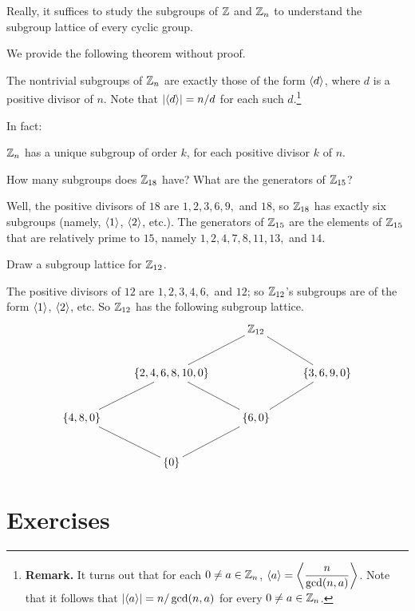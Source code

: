 Really, it suffices to study the subgroups of $\mathbb{Z}$ and $\mathbb{Z}_n$ to understand the subgroup lattice of every cyclic group.

We provide the following theorem without proof.

\begin{thm}\label{znsubgps} The nontrivial subgroups of $\mathbb{Z}_n$ are exactly those of the form $\langle d\rangle$, where $d$ is a positive divisor of $n$. Note that $|\langle d\rangle|=n/d$ for each such $d$.\footnote{
\textbf{Remark.} It turns out that for each $0\neq a\in \mathbb{Z}_n$, $\displaystyle{\langle a\rangle=\left\langle\frac{n}{\gcd(n,a)}\right\rangle}$. Note that it follows that $|\langle a\rangle|=n/\gcd(n,a)$ for every $0\neq a \in \mathbb{Z}_n$.} \end{thm}


In fact:
\begin{thm}\label{} $\mathbb{Z}_n$ has a unique subgroup of order $k$, for each positive divisor $k$ of $n$.\end{thm}

\begin{example}{} How many subgroups does $\mathbb{Z}_{18}$ have?  What are the generators of $\mathbb{Z}_{15}$?

Well, the positive divisors of $18$ are $1,2,3,6,9,$ and $18$, so $\mathbb{Z}_{18}$ has exactly six subgroups (namely, $\langle1\rangle$, $\langle2\rangle$, etc.).
The generators of $\mathbb{Z}_{15}$ are the elements of $\mathbb{Z}_{15}$ that are relatively prime to $15$, namely $1,2,4,7,8,11,13,$ and $14$. \end{example}


\begin{example}{} Draw a subgroup lattice for $\mathbb{Z}_{12}$.

The positive divisors of $12$ are $1,2,3,4,6,$ and $12$; so
$\mathbb{Z}_{12}$'s subgroups are of the form $\langle1\rangle$, $\langle2\rangle$, etc. So
$\mathbb{Z}_{12}$ has the following subgroup lattice.
$$\xymatrix{
&&\Z_{12} \ar@{-}[ld] \ar@{-}[rd]&\\
&\{2,4,6,8,10,0\} \ar@{-}[ld]\ar@{-}[rd]&&\{3,6,9,0\} \ar@{-}[ld]\\ \{4,8,0\}\ar@{-}[dr]&& \{6,0\} \ar@{-}[dl]& \\
& \{0\}&&}$$
\end{example}

\pagebreak
\section{Exercises}

